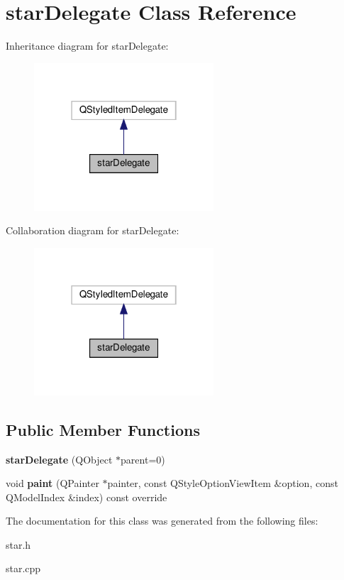 \hypertarget{classstar_delegate}{}\section{star\+Delegate Class Reference}
\label{classstar_delegate}


Inheritance diagram for star\+Delegate\+:\nopagebreak
\begin{figure}[H]
\begin{center}
\leavevmode
\includegraphics[width=190pt]{classstar_delegate__inherit__graph}
\end{center}
\end{figure}


Collaboration diagram for star\+Delegate\+:\nopagebreak
\begin{figure}[H]
\begin{center}
\leavevmode
\includegraphics[width=190pt]{classstar_delegate__coll__graph}
\end{center}
\end{figure}
\subsection*{Public Member Functions}
\begin{DoxyCompactItemize}
\item 
\mbox{\label{classstar_delegate_abf63fe9c7fe7e4c2253168e69eca595c}} 
{\bfseries star\+Delegate} (Q\+Object $\ast$parent=0)
\item 
\mbox{\label{classstar_delegate_a563a1503f4f1bd5e5f2d8762b95167c7}} 
void {\bfseries paint} (Q\+Painter $\ast$painter, const Q\+Style\+Option\+View\+Item \&option, const Q\+Model\+Index \&index) const override
\end{DoxyCompactItemize}


The documentation for this class was generated from the following files\+:\begin{DoxyCompactItemize}
\item 
star.\+h\item 
star.\+cpp\end{DoxyCompactItemize}
